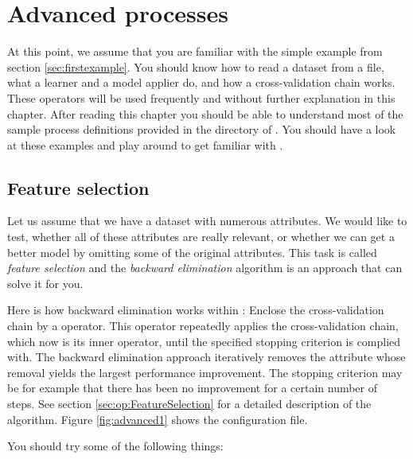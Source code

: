 \chapter{Advanced processes}
\label{sec:advanced}

At this point, we assume that you are familiar with the simple example 
from section \ref{sec:firstexample}. 
You should know how to read a dataset from a file, what a learner and 
a model applier do, and how a cross-validation chain works.
These operators will be used frequently and without further explanation
in this chapter. After reading this chapter you should be able to understand
most of the sample process definitions provided in the  directory of
\rapidminer. You should have a look at these examples and play around to get
familiar with \rapidminer.



\section{Feature selection}
\label{sec:advanced_feature_selection}
Let us assume that we have a dataset with numerous attributes. 
We would like to test, whether all of these attributes are really
relevant, or whether we can get a better model by omitting some of 
the original attributes.
This task is called {\em feature selection} and the 
{\em backward elimination} algorithm is an approach that can 
solve it for you. 

Here is how backward elimination works within \rapidminer:
Enclose the cross-validation chain by a  
operator. This operator repeatedly applies the cross-validation chain,
which now is its inner operator, until the specified stopping
criterion is complied with. The backward elimination approach
iteratively removes the attribute whose removal yields the largest
performance improvement. The stopping criterion may be for example 
that there has been no improvement for a certain number of steps. See
section \ref{sec:op:FeatureSelection} for a detailed description of
the algorithm. Figure \ref{fig:advanced1} shows the configuration
file.

You should try some of the following things:


